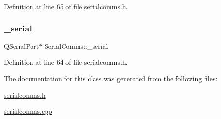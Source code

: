 Definition at line 65 of file serialcomms.\+h.

\mbox{\label{class_serial_comms_a0f5a6dcd2bcf9c0b6cd6e60bbad4240e}} 
\subsubsection{\texorpdfstring{\_serial}{\_serial}}
{\footnotesize\ttfamily Q\+Serial\+Port$\ast$ Serial\+Comms\+::\+\_\+serial\hspace{0.3cm}{\ttfamily [private]}}



Definition at line 64 of file serialcomms.\+h.



The documentation for this class was generated from the following files\+:\begin{DoxyCompactItemize}
\item 
\mbox{\hyperlink{serialcomms_8h}{serialcomms.\+h}}\item 
\mbox{\hyperlink{serialcomms_8cpp}{serialcomms.\+cpp}}\end{DoxyCompactItemize}
